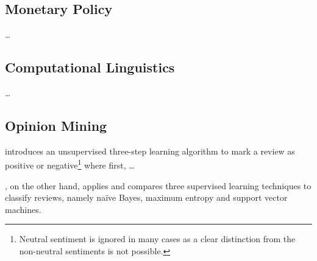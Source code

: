 
\subsection{Monetary Policy}

\dots


\subsection{Computational Linguistics}

\dots


\subsection{Opinion Mining}

\textcite{Turney.2002} introduces an unsupervised three-step learning algorithm to mark a review as positive or negative\footnote{Neutral sentiment is ignored in many cases as a clear distinction from the non-neutral sentiments is not possible.} where first, \dots

\textcite{Pang.2002}, on the other hand, applies and compares three supervised learning techniques to classify reviews, namely na\"{i}ve Bayes, maximum entropy and support vector machines. 


